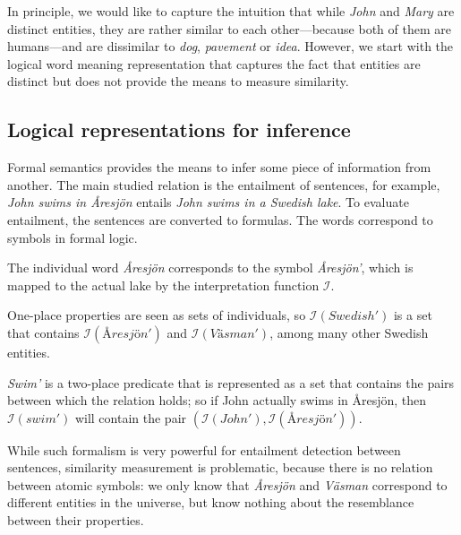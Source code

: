 In principle, we would like to capture the intuition that while \textit{John} and \textit{Mary} are distinct entities, they are rather similar to each other---because both of them are humans---and are dissimilar to \textit{dog}, \textit{pavement} or \textit{idea}. However, we start with the logical word meaning representation that captures the fact that entities are distinct but does not provide the means to measure similarity.

\subsection{Logical representations for inference}
\label{sec:classical-approaches}

Formal semantics provides the means to infer\footnotemark{} some piece of information from another. The main studied relation is the entailment of sentences, for example, \textit{John swims in Åresjön} entails \textit{John swims in a Swedish lake}. To evaluate entailment, the sentences are converted to formulas. The words correspond to symbols in formal logic.


The individual word \textit{Åresjön} corresponds to the symbol \textit{Åresjön'}, which is mapped to the actual lake by the interpretation function $\mathcal{I}$.

One-place properties are seen as sets of individuals, so $\mathcal{I}(\mathit{Swedish'})$ is a set that contains $\mathcal{I}(\mathit{Åresjön'})$ and $\mathcal{I}(\mathit{Väsman'})$, among many other Swedish entities.

\textit{Swim'} is a two-place predicate that is represented as a set that contains the pairs between which the relation holds; so if John actually swims in Åresjön, then $\mathcal{I}(\mathit{swim'})$ will contain the pair $(\mathcal{I}(\mathit{John'}), \mathcal{I}(\mathit{Åresjön'}))$.

While such formalism is very powerful for entailment detection between sentences, similarity measurement is problematic,\footnotemark{} because there is no relation between atomic symbols: we only know that \textit{Åresjön} and \textit{Väsman} correspond to different entities in the universe, but know nothing about the resemblance between their properties.


